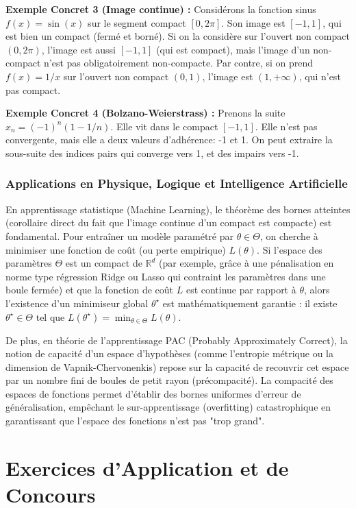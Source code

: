 \documentclass[11pt,a4paper]{article}
\begin{document}
\textbf{Exemple Concret 3 (Image continue) :} Considérons la fonction sinus $f(x) = \sin(x)$ sur le segment compact $[0, 2\pi]$. Son image est $[-1, 1]$, qui est bien un compact (fermé et borné). Si on la considère sur l'ouvert non compact $(0, 2\pi)$, l'image est aussi $[-1, 1]$ (qui est compact), mais l'image d'un non-compact n'est pas obligatoirement non-compacte. Par contre, si on prend $f(x) = 1/x$ sur l'ouvert non compact $(0, 1)$, l'image est $(1, +\infty)$, qui n'est pas compact.

\textbf{Exemple Concret 4 (Bolzano-Weierstrass) :} Prenons la suite $x_n = (-1)^n (1 - 1/n)$. Elle vit dans le compact $[-1, 1]$. Elle n'est pas convergente, mais elle a deux valeurs d'adhérence: -1 et 1. On peut extraire la sous-suite des indices pairs qui converge vers 1, et des impairs vers -1.


\section{Applications en Physique, Logique et Intelligence Artificielle}

En apprentissage statistique (Machine Learning), le théorème des bornes atteintes (corollaire direct du fait que l'image continue d'un compact est compacte) est fondamental. Pour entraîner un modèle paramétré par $\theta \in \Theta$, on cherche à minimiser une fonction de coût (ou perte empirique) $L(\theta)$.
Si l'espace des paramètres $\Theta$ est un compact de $\mathbb{R}^d$ (par exemple, grâce à une pénalisation en norme type régression Ridge ou Lasso qui contraint les paramètres dans une boule fermée) et que la fonction de coût $L$ est continue par rapport à $\theta$, alors l'existence d'un minimiseur global $\theta^\star$ est mathématiquement garantie : il existe $\theta^\star \in \Theta$ tel que $L(\theta^\star) = \min_{\theta \in \Theta} L(\theta)$.

De plus, en théorie de l'apprentissage PAC (Probably Approximately Correct), la notion de capacité d'un espace d'hypothèses (comme l'entropie métrique ou la dimension de Vapnik-Chervonenkis) repose sur la capacité de recouvrir cet espace par un nombre fini de boules de petit rayon (précompacité). La compacité des espaces de fonctions permet d'établir des bornes uniformes d'erreur de généralisation, empêchant le sur-apprentissage (overfitting) catastrophique en garantissant que l'espace des fonctions n'est pas "trop grand".


\part{Exercices d'Application et de Concours}
\end{document}
